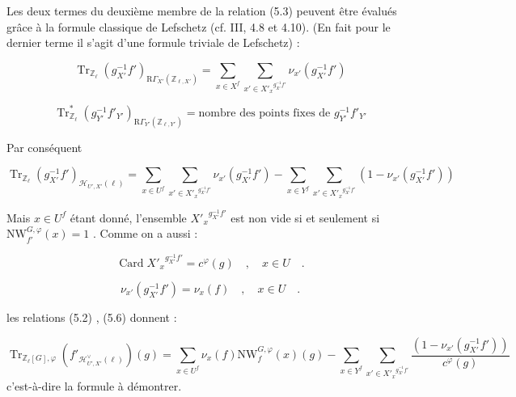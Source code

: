 \documentclass[11pt]{article}
\newcommand{\R}{\mathrm{R}}\newcommand{\RHomCore}{\mathrm{RHom}}
\providecommand{\Tr}{\operatorname{Tr}}
\providecommand{\Tr}{\operatorname{Tr}}
\providecommand{\Tr}{\operatorname{Tr}}
\providecommand{\R}{\mathrm R}
\providecommand{\Tr}{\operatorname{Tr}}
\providecommand{\bZ}{\mathbb Z}
\providecommand{\Tr}{\operatorname{Tr}}
\begin{document}
Les deux termes du deuxième membre de la relation (5.3) peuvent être évalués grâce à la formule classique de Lefschetz (cf. III, 4.8 et 4.10). (En fait pour le dernier terme il s'agit d'une formule triviale de Lefschetz) :

\begin{equation}\tag{5.4}
\Tr_{\bZ_\ell}(g_{X'}^{-1}f')_{\R\Gamma_{X'}(\bZ_{\ell,X'})} = \sum_{x \in X^f} \sum_{x' \in {X'_x}^{g_{X'}^{-1}f'}} \nu_{x'}(g_{X'}^{-1}f')
\end{equation}

\begin{equation}\tag{5.5}
\Tr^*_{\bZ_\ell}(g_{Y'}^{-1}f'_{Y'})_{\R\Gamma_{Y'}(\bZ_{\ell,Y'})} = \text{nombre des points fixes de } g_{Y'}^{-1}f'_{Y'}
\end{equation}

Par conséquent

\begin{equation}\tag{5.6}
\Tr_{\bZ_\ell}(g_{X'}^{-1}f')_{\mathcal{H}_{U',X'}(\ell)} = \sum_{x \in U^f} \sum_{x' \in {X'_x}^{g_{X'}^{-1}f'}} \nu_{x'}(g_{X'}^{-1}f') - \sum_{x \in Y^f} \sum_{x' \in {X'_x}^{g_{X'}^{-1}f'}} (1 - \nu_{x'}(g_{X'}^{-1}f'))
\end{equation}

Mais $x \in U^f$ étant donné, l'ensemble ${X'_x}^{g_{X'}^{-1}f'}$ est non vide si et seulement si $\mathrm{NW}_{f'}^{G,\varphi}(x) = 1$ . Comme on a aussi :

\begin{equation}\tag{5.7}
\operatorname{Card} {X'_x}^{g_{X'}^{-1}f'} = c^\varphi(g) \quad , \quad x \in U \quad .
\end{equation}

\begin{equation}\tag{5.8}
\nu_{x'}(g_{X'}^{-1}f') = \nu_x(f) \quad , \quad x \in U \quad .
\end{equation}

les relations (5.2) , (5.6) donnent :

\begin{equation}\tag{5.9}
\Tr_{\bZ_\ell[G],\varphi}(f'_{\mathcal{H}^\vee_{U',X'}(\ell)})(g) = \sum_{x \in U^f} \nu_x(f) \mathrm{NW}_f^{G,\varphi}(x)(g) - \sum_{x \in Y^f} \sum_{x' \in {X'_x}^{g_{X'}^{-1}f'}} \frac{(1 - \nu_{x'}(g_{X'}^{-1}f'))}{c^\varphi(g)}
\end{equation}
c'est-à-dire la formule à démontrer.
\end{document}
